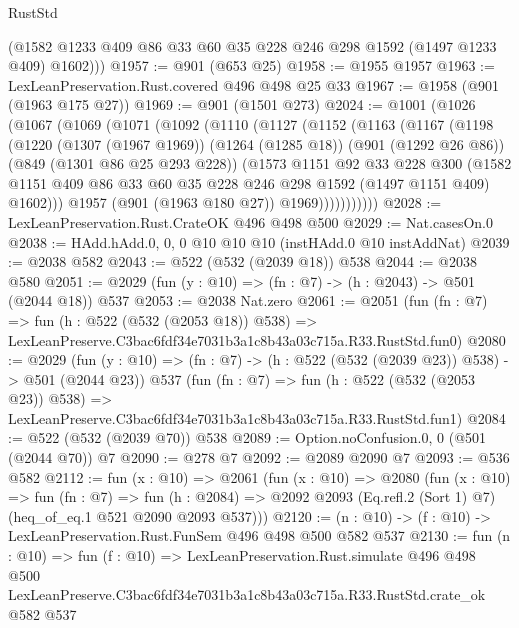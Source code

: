 \begin{lexlean}{RustStd}
\begin{coremodule}
        (@1582 @1233 @409 @86 @33 @60 @35 @228 @246 @298 @1592 (@1497 @1233 @409) @1602)))
@1957 := @901 (@653 @25)
@1958 := @1955 @1957
@1963 := LexLeanPreservation.Rust.covered @496 @498 @25 @33
@1967 := @1958 (@901 (@1963 @175 @27))
@1969 := @901 (@1501 @273)
@2024 := @1001
    (@1026
      (@1067
        (@1069
          (@1071
            (@1092
              (@1110
                (@1127
                  (@1152
                    (@1163
                      (@1167
                        (@1198
                          (@1220
                            (@1307 (@1967 @1969))
                            (@1264 (@1285 @18))
                            (@901 (@1292 @26 @86))
                            (@849 (@1301 @86 @25 @293 @228))
                            (@1573
                              @1151
                              @92
                              @33
                              @228
                              @300
                              (@1582
                                @1151
                                @409
                                @86
                                @33
                                @60
                                @35
                                @228
                                @246
                                @298
                                @1592
                                (@1497 @1151 @409)
                                @1602)))
                          @1957
                          (@901 (@1963 @180 @27))
                          @1969)))))))))))
@2028 := LexLeanPreservation.Rust.CrateOK @496 @498 @500
@2029 := Nat.casesOn.{0}
@2038 := HAdd.hAdd.{0, 0, 0} @10 @10 @10 (instHAdd.{0} @10 instAddNat)
@2039 := @2038 @582
@2043 := @522 (@532 (@2039 @18)) @538
@2044 := @2038 @580
@2051 := @2029 (fun (y : @10) => (fn : @7) -> (h : @2043) -> @501 (@2044 @18)) @537
@2053 := @2038 Nat.zero
@2061 := @2051
    (fun (fn : @7) =>
    fun (h : @522 (@532 (@2053 @18)) @538) =>
    LexLeanPreserve.C3bac6fdf34e7031b3a1c8b43a03c715a.R33.RustStd.fun0)
@2080 := @2029
    (fun (y : @10) => (fn : @7) -> (h : @522 (@532 (@2039 @23)) @538) -> @501 (@2044 @23))
    @537
    (fun (fn : @7) =>
    fun (h : @522 (@532 (@2053 @23)) @538) =>
    LexLeanPreserve.C3bac6fdf34e7031b3a1c8b43a03c715a.R33.RustStd.fun1)
@2084 := @522 (@532 (@2039 @70)) @538
@2089 := Option.noConfusion.{0, 0} (@501 (@2044 @70)) @7
@2090 := @278 @7
@2092 := @2089 @2090 @7
@2093 := @536 @582
@2112 := fun (x : @10) =>
  @2061
    (fun (x : @10) =>
    @2080
      (fun (x : @10) =>
      fun (fn : @7) =>
      fun (h : @2084) =>
      @2092 @2093 (Eq.refl.{2} (Sort 1) @7) (heq_of_eq.{1} @521 @2090 @2093 @537)))
@2120 := (n : @10) -> (f : @10) -> LexLeanPreservation.Rust.FunSem @496 @498 @500 @582 @537
@2130 := fun (n : @10) =>
  fun (f : @10) =>
  LexLeanPreservation.Rust.simulate
    @496
    @498
    @500
    LexLeanPreserve.C3bac6fdf34e7031b3a1c8b43a03c715a.R33.RustStd.crate_ok
    @582
    @537
\end{coremodule}
\end{lexlean}
